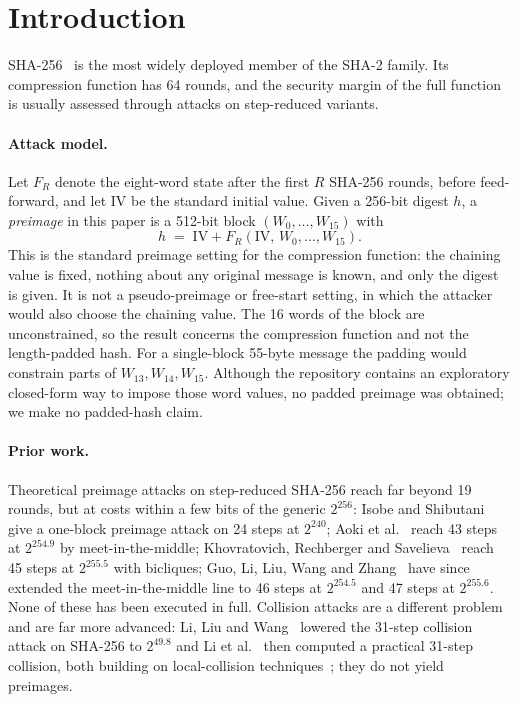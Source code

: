 \documentclass[11pt,a4paper]{article}
\begin{document}
\section{Introduction}
\label{sec:intro}

SHA-256~\cite{FIPS180} is the most widely deployed member of the SHA-2
family.  Its compression function has 64 rounds, and the security margin of
the full function is usually assessed through attacks on step-reduced
variants.

\paragraph{Attack model.}
Let $F_R$ denote the eight-word state after the first $R$ SHA-256 rounds,
before feed-forward, and let $\mathrm{IV}$ be the standard initial value.
Given a 256-bit digest $h$, a \emph{preimage} in this paper is a 512-bit block
$(W_0,\ldots,W_{15})$ with
\[
  h \;=\; \mathrm{IV} + F_R(\mathrm{IV},\,W_0,\ldots,W_{15}) .
\]
This is the standard preimage setting for the compression function: the
chaining value is fixed, nothing about any original message is known, and
only the digest is given.  It is not a pseudo-preimage or free-start
setting, in which the attacker would also choose the chaining value.  The
16 words of the block are unconstrained, so the result concerns the
compression function and not the length-padded hash.  For a single-block
55-byte message the padding would constrain parts of
$W_{13},W_{14},W_{15}$.  Although the repository contains an exploratory
closed-form way to impose those word values, no padded preimage was obtained;
we make no padded-hash claim.

\paragraph{Prior work.}
Theoretical preimage attacks on step-reduced SHA-256 reach far beyond 19
rounds, but at costs within a few bits of the generic $2^{256}$: Isobe and
Shibutani~\cite{IsobeShibutani2009} give a one-block preimage attack on 24
steps at $2^{240}$; Aoki et al.~\cite{AokiGuo2009} reach 43 steps at
$2^{254.9}$ by meet-in-the-middle; Khovratovich, Rechberger and
Savelieva~\cite{KRS2012} reach 45 steps at $2^{255.5}$ with bicliques; Guo, Li, Liu, Wang and Zhang~\cite{GuoLiLiuWangZhang2026} have since extended the meet-in-the-middle line to 46 steps at $2^{254.5}$ and 47 steps at $2^{255.6}$.  None of these has been executed in full.  Collision attacks are a different problem and are far more advanced: Li, Liu and Wang~\cite{LiLiuWang2024} lowered the 31-step collision attack on SHA-256 to $2^{49.8}$ and Li et al.~\cite{LiLiuWangDongSun2024} then computed a practical 31-step collision, both building on local-collision techniques~\cite{SanadhyaSarkar2008,MendelNadSchlaffer2013}; they do not yield preimages.
\end{document}
